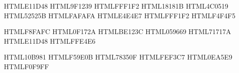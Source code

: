 \definecolor{accent}      {HTML}{E11D48} %
\definecolor{accentDark}  {HTML}{9F1239} %
\definecolor{accentPale}  {HTML}{FFF1F2} %
\definecolor{dark}        {HTML}{18181B} %
\definecolor{coverBg}     {HTML}{4C0519} %
\definecolor{mid}         {HTML}{52525B} %
\definecolor{light}       {HTML}{FAFAFA} %
\definecolor{border}      {HTML}{E4E4E7} %
\definecolor{tableHdr}    {HTML}{FFF1F2} %
\definecolor{sidebarBg}   {HTML}{F4F4F5} %

\definecolor{codeBg}      {HTML}{F8FAFC} %
\definecolor{codeText}    {HTML}{0F172A} %
\definecolor{codeKw}      {HTML}{BE123C} %
\definecolor{codeStr}     {HTML}{059669} %
\definecolor{codeCmt}     {HTML}{71717A} %
\definecolor{inlineCode}  {HTML}{E11D48} %
\definecolor{inlineBg}    {HTML}{FFE4E6} %

\definecolor{success}     {HTML}{10B981} %
\definecolor{warn}        {HTML}{F59E0B} %
\definecolor{warnDark}    {HTML}{78350F} 
\definecolor{warnBg}      {HTML}{FEF3C7} 
\definecolor{infoGreen}   {HTML}{0EA5E9} %
\definecolor{infoBg}      {HTML}{F0F9FF}